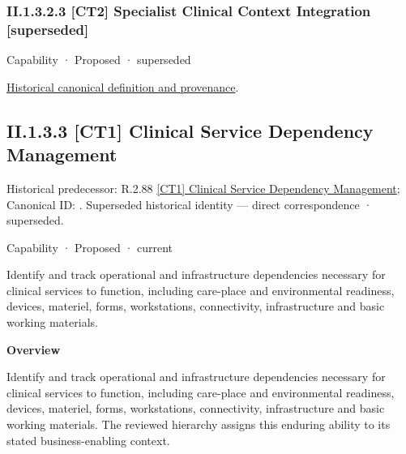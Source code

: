 \subsubsection*{II.1.3.2.3 [CT2] Specialist Clinical Context Integration [superseded]}
\label{navigation:II.1.3.2.3}

\label{element:062802a425d14530b0ce9434c5980d85}
{\small Capability · Proposed · superseded}\par
\href{../../../../../../../continuum/strategy/capability/062802a425d14530b0ce9434c5980d85.md}{Historical canonical definition and provenance}.\par
\subsection*{II.1.3.3 [CT1] Clinical Service Dependency Management}
\label{navigation:II.1.3.3}

{\small Historical predecessor: R.2.88 \hyperref[element:984ee17123eb4f92b3e55e55d24459b8]{[CT1] Clinical Service Dependency Management}; Canonical ID: \texttt{}. Superseded historical identity — direct correspondence · superseded.}\par
\label{element:232db9b8b47c450cb0aa9acaf539c09d}
{\small Capability · Proposed · current}\par

Identify and track operational and infrastructure dependencies necessary for clinical services to function, including care-place and environmental readiness, devices, materiel, forms, workstations, connectivity, infrastructure and basic working materials.



\textbf{Overview}



Identify and track operational and infrastructure dependencies necessary for clinical services to function, including care-place and environmental readiness, devices, materiel, forms, workstations, connectivity, infrastructure and basic working materials. The reviewed hierarchy assigns this enduring ability to its stated business-enabling context.



